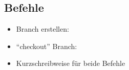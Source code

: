 \subsection{Befehle}\label{subsec:befehle}

\begin{frame}
    \slidehead
    \vspace{-1em}
    \begin{itemize}[<+->]
        \item Branch erstellen:
        \item \enquote{checkout} Branch:
        \item Kurzschreibweise für beide Befehle
    \end{itemize}
\end{frame}

